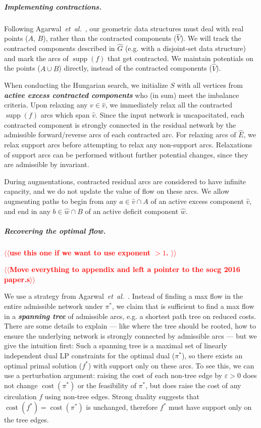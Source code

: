 \documentclass[a4paper,UKenglish]{socg-lipics-v2018}
\makeatletter
\def\note#1{\textcolor{red}{{#1}}}
\def\etal{\emph{et~al.}}
\def\etal{\textit{et~al.}}
\def\eps{\varepsilon}
\def\cost{\operatorname{cost}}
\def\supp{\operatorname{supp}}
\theoremstyle{plain}
\numberwithin{figure}{section}
\renewcommand{\paragraph}{\subparagraph}
\def\EMPH#1{\textbf{\emph{\boldmath #1}}}
\def\n@te#1{\textsf{\boldmath \textbf{$\langle\!\langle$#1$\rangle\!\rangle$}}\leavevmode}
\def\note#1{\textcolor{red}{\n@te{#1}}}
\makeatother
\begin{document}
\paragraph{Implementing contractions.}
Following Agarwal~\etal~\cite{AFPVX17}, our geometric data structures must deal
with real points ($A$, $B$), rather than the contracted components ($\hat{V}$).
We will track the contracted components described in $\hat{G}$ (e.g. with a
disjoint-set data structure) and mark the arcs of $\supp(f)$ that get
contracted.
We maintain potentials on the points ($A \cup B$) directly, instead of the
contracted components ($\hat{V}$).

When conducting the Hungarian search, we initialize $S$ with all vertices from
\EMPH{active excess contracted components} who (in sum) meet the imbalance
criteria.
Upon relaxing any $v \in \hat{v}$, we immediately relax all the contracted
$\supp(f)$ arcs which span $\hat{v}$.
Since the input network is uncapacitated, each contracted component is
strongly connected in the residual network by the admissible forward/reverse
arcs of each contracted arc.
For relaxing arcs of $\hat{E}$, we relax support arcs before attempting to
relax any non-support arcs.
Relaxations of support arcs can be performed without further potential changes,
since they are admissible by invariant.

During augmentations, contracted residual arcs are considered to have infinite
capacity, and we do not update the value of flow on these arcs.
We allow augmenting paths to begin from any $a \in \hat{v} \cap A$ of an active
excess component $\hat{v}$, and end in any $b \in \hat{w} \cap B$ of an active
deficit component $\hat{w}$.

\paragraph{Recovering the optimal flow.}
\note{use this one if we want to use exponent $>1$. } %

\note{Move everything to appendix and left a pointer to the socg 2016 paper.s}

We use a strategy from Agarwal~\etal~\cite{AFPVX17}.
Instead of finding a max flow in the entire admissible network under $\pi^*$,
we claim that is sufficient to find a max flow in a \EMPH{spanning tree} of
admissible arcs, e.g. a shortest path tree on reduced costs.
There are some details to explain --- like where the tree should be rooted, how
to ensure the underlying network is strongly connected by admissible arcs ---
but we give the intuition first:
Such a spanning tree is a maximal set of linearly independent dual LP
constraints for the optimal dual ($\pi^*$), so there exists an optimal primal
solution ($f^*$) with support only on these arcs.
To see this, we can use a perturbation argument: raising the cost of each
non-tree edge by $\eps > 0$ does not change $\cost(\pi^*)$ or the feasibility
of $\pi^*$, but does raise the cost of any circulation $f$ using non-tree
edges.
Strong duality suggests that $\cost(f^*) = \cost(\pi^*)$ is unchanged,
therefore $f^*$ must have support only on the tree edges.
\end{document}
